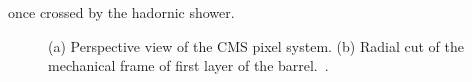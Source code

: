  once crossed by the hadornic shower.
\begin{figure}[hbt]
  \begin{center}
    \caption{(a) Perspective view of the CMS pixel system. (b) Radial cut of the mechanical 
	    frame of first layer of the barrel.~\cite{Karimaki:368412}.} 
    \label{fig:pixels}
  \end{center}
\end{figure}

